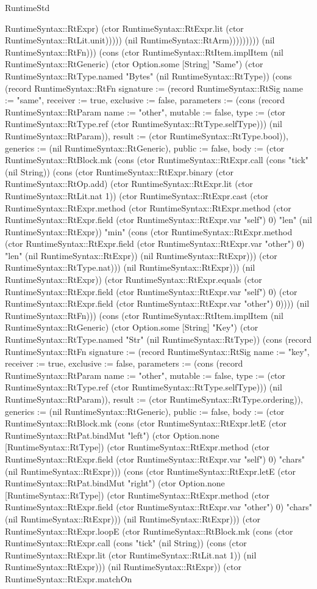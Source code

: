 \begin{lexlean}{RuntimeStd}
\begin{semanticmodule}
{RuntimeSyntax::RtExpr) (ctor RuntimeSyntax::RtExpr.lit (ctor RuntimeSyntax::RtLit.unit))))) (nil RuntimeSyntax::RtArm))))))))}) (nil RuntimeSyntax::RtFn))) (cons (ctor RuntimeSyntax::RtItem.implItem (nil RuntimeSyntax::RtGeneric) (ctor Option.some [String] "Same") (ctor RuntimeSyntax::RtType.named "Bytes" (nil RuntimeSyntax::RtType)) (cons (record RuntimeSyntax::RtFn {signature := (record RuntimeSyntax::RtSig {name := "same", receiver := true, exclusive := false, parameters := (cons (record RuntimeSyntax::RtParam {name := "other", mutable := false, type := (ctor RuntimeSyntax::RtType.ref (ctor RuntimeSyntax::RtType.selfType))}) (nil RuntimeSyntax::RtParam)), result := (ctor RuntimeSyntax::RtType.bool)}), generics := (nil RuntimeSyntax::RtGeneric), public := false, body := (ctor RuntimeSyntax::RtBlock.mk (cons (ctor RuntimeSyntax::RtExpr.call (cons "tick" (nil String)) (cons (ctor RuntimeSyntax::RtExpr.binary (ctor RuntimeSyntax::RtOp.add) (ctor RuntimeSyntax::RtExpr.lit (ctor RuntimeSyntax::RtLit.nat 1)) (ctor RuntimeSyntax::RtExpr.cast (ctor RuntimeSyntax::RtExpr.method (ctor RuntimeSyntax::RtExpr.method (ctor RuntimeSyntax::RtExpr.field (ctor RuntimeSyntax::RtExpr.var "self") 0) "len" (nil RuntimeSyntax::RtExpr)) "min" (cons (ctor RuntimeSyntax::RtExpr.method (ctor RuntimeSyntax::RtExpr.field (ctor RuntimeSyntax::RtExpr.var "other") 0) "len" (nil RuntimeSyntax::RtExpr)) (nil RuntimeSyntax::RtExpr))) (ctor RuntimeSyntax::RtType.nat))) (nil RuntimeSyntax::RtExpr))) (nil RuntimeSyntax::RtExpr)) (ctor RuntimeSyntax::RtExpr.equals (ctor RuntimeSyntax::RtExpr.field (ctor RuntimeSyntax::RtExpr.var "self") 0) (ctor RuntimeSyntax::RtExpr.field (ctor RuntimeSyntax::RtExpr.var "other") 0)))}) (nil RuntimeSyntax::RtFn))) (cons (ctor RuntimeSyntax::RtItem.implItem (nil RuntimeSyntax::RtGeneric) (ctor Option.some [String] "Key") (ctor RuntimeSyntax::RtType.named "Str" (nil RuntimeSyntax::RtType)) (cons (record RuntimeSyntax::RtFn {signature := (record RuntimeSyntax::RtSig {name := "key", receiver := true, exclusive := false, parameters := (cons (record RuntimeSyntax::RtParam {name := "other", mutable := false, type := (ctor RuntimeSyntax::RtType.ref (ctor RuntimeSyntax::RtType.selfType))}) (nil RuntimeSyntax::RtParam)), result := (ctor RuntimeSyntax::RtType.ordering)}), generics := (nil RuntimeSyntax::RtGeneric), public := false, body := (ctor RuntimeSyntax::RtBlock.mk (cons (ctor RuntimeSyntax::RtExpr.letE (ctor RuntimeSyntax::RtPat.bindMut "left") (ctor Option.none [RuntimeSyntax::RtType]) (ctor RuntimeSyntax::RtExpr.method (ctor RuntimeSyntax::RtExpr.field (ctor RuntimeSyntax::RtExpr.var "self") 0) "chars" (nil RuntimeSyntax::RtExpr))) (cons (ctor RuntimeSyntax::RtExpr.letE (ctor RuntimeSyntax::RtPat.bindMut "right") (ctor Option.none [RuntimeSyntax::RtType]) (ctor RuntimeSyntax::RtExpr.method (ctor RuntimeSyntax::RtExpr.field (ctor RuntimeSyntax::RtExpr.var "other") 0) "chars" (nil RuntimeSyntax::RtExpr))) (nil RuntimeSyntax::RtExpr))) (ctor RuntimeSyntax::RtExpr.loopE (ctor RuntimeSyntax::RtBlock.mk (cons (ctor RuntimeSyntax::RtExpr.call (cons "tick" (nil String)) (cons (ctor RuntimeSyntax::RtExpr.lit (ctor RuntimeSyntax::RtLit.nat 1)) (nil RuntimeSyntax::RtExpr))) (nil RuntimeSyntax::RtExpr)) (ctor RuntimeSyntax::RtExpr.matchOn }
\end{semanticmodule}
\end{lexlean}
